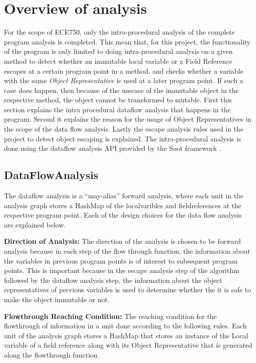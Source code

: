 \section{Overview of analysis}\label{sec:analysis}
For the scope of ECE750, only the intra-procedural analysis of the complete program analysis is completed. This mean that, for this project, the functionality of the program is only limited to doing intra-procedural analysis on a given method to detect whether an immutable local variable or a Field Reference escapes at a certain program point in a method, and checks whether a variable with the same \textit{Object Representative} is used at a later program point. If such a case does happen, then because of the usecase of the immutable object in the respective method, the object cannot be transformed to mutable. First this section explains the intra procedural dataflow analysis that happens in the program. Second it explains the reason for the usage of Object Representatives \cite{ref:or} in the scope of the data flow analysis. Lastly the escape analysis rules used in the project to detect object escaping is explained. The intra-procedural analysis is done using the dataflow analysis API provided by the Soot framework \citep{ref:Soot}.

\subsection{DataFlowAnalysis}\label{sec:dataflow}
The dataflow analysis is a ``may-alias'' forward analysis, where each unit in the analysis graph stores a HashMap of the localvaribles and fieldreferences at the respective program point. Each of the design choices for the data flow analysis are explained below.

\textbf{Direction of Analysis:} The direction of the analysis is chosen to be forward analysis because in each step of the flow through function, the information about the variables in previous program points is of interest to subsequent program points. This is important because in the escape analysis step of the algorithm followed by the dataflow analysis step, the information about the object representatives of previous variables is used to determine whether the it is safe to make the object immutable or not.

\textbf{Flowthrough Reaching Condition:} The reaching condition for the flowthrough of information in a unit done according to the following rules. Each unit of the analysis graph stores a HashMap that stores an instance of the Local variable of a field reference along with its Object Representative that is generated along the flowthrough function.
\vspace{5mm}

